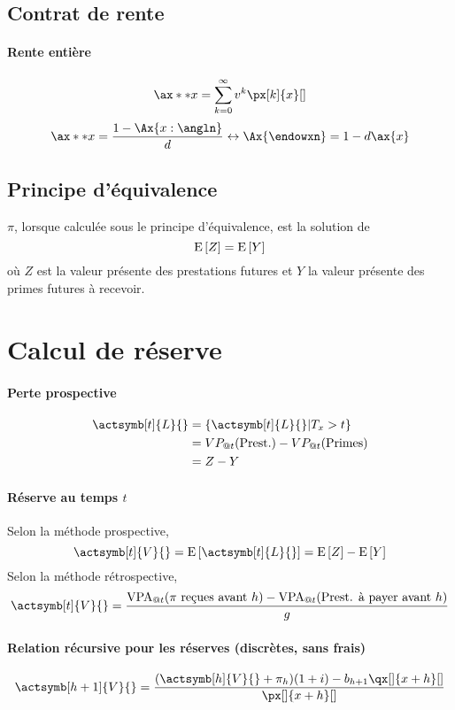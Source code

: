 \documentclass[10pt, french]{article}
\begin{document}
\begin{multicols*}{3}
\subsection*{Contrat de rente}
\paragraph{Rente entière}
\[\ax**{x} = \sum_{k=0}^{\infty} v^{k} \px[k]{x}[]  \]
\[\ax**{x} = \frac{1 - \Ax{x:\angln}}{d} \leftrightarrow \Ax{\endowxn} =1 - d \ax{x}\]




\subsection*{Principe d'équivalence}
$\pi$, lorsque calculée sous le principe d'équivalence, est la solution de
\[\mathrm{E} \left[ Z \right] = \mathrm{E} \left[ Y \right]\]
où $Z$ est la valeur présente des prestations futures et $Y$ la valeur présente des primes futures à recevoir.

\section{Calcul de réserve}
\paragraph{Perte prospective}
\begin{align*}
\actsymb[t]{L}{} & = \{ \actsymb[t]{L}{} | T_x > t \} \\
& = VP_{@t}(\text{Prest.}) - VP_{@t}(\text{Primes}) \\
& = Z - Y
\end{align*}

\paragraph{Réserve au temps $t$}
Selon la méthode prospective,
\[\actsymb[t]{V}{} = \esp{\actsymb[t]{L}{}} = \esp{Z} - \esp{Y}\]
Selon la méthode rétrospective,
\[\actsymb[t]{V}{} = \frac{\text{VPA}_{@t}(\text{$\pi$ reçues avant $h$}) - \text{VPA}_{@t}(\text{Prest. à payer avant $h$})}{g}\]

\paragraph{Relation récursive pour les réserves (discrètes, sans frais)}
\[\actsymb[h+1]{V}{} = \frac{(\actsymb[h]{V}{} + \pi_h)(1+i) - b_{h+1} \qx[]{x+h}[]}{\px[]{x+h}[]}\]








\end{multicols*}
\end{document}
